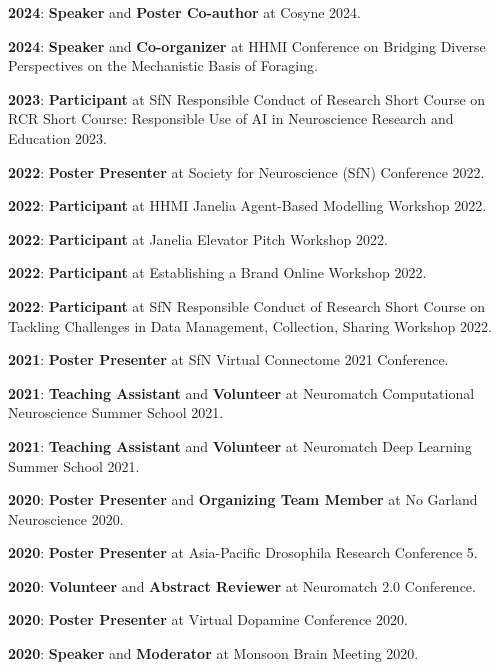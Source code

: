 \documentclass[letterpaper,9pt]{article}
\newcommand{\resumeItem}[2]{
  \item\small{
    \textbf{#1}{: #2 \vspace{-2pt}}
  }
}
\newcommand{\resumeSubItem}[2]{\resumeItem{#1}{#2}\vspace{-4pt}}
\begin{document}
    \resumeSubItem{2024}
      {\textbf{Speaker} and \textbf{Poster Co-author} at Cosyne 2024.}
    
    \resumeSubItem{2024}
      {\textbf{Speaker} and \textbf{Co-organizer} at HHMI Conference on Bridging Diverse Perspectives on the Mechanistic Basis of Foraging.}
    
    \resumeSubItem{2023}
      {\textbf{Participant} at SfN Responsible Conduct of Research Short Course on RCR Short Course: Responsible Use of AI in Neuroscience Research and Education 2023.}
    
    \resumeSubItem{2022}
      {\textbf{Poster Presenter} at Society for Neuroscience (SfN) Conference 2022.}
    
    \resumeSubItem{2022}
      {\textbf{Participant} at HHMI Janelia Agent-Based Modelling Workshop 2022.}
    
    \resumeSubItem{2022}
      {\textbf{Participant} at Janelia Elevator Pitch Workshop 2022.}
    
    \resumeSubItem{2022}
      {\textbf{Participant} at Establishing a Brand Online Workshop 2022.}
    
    \resumeSubItem{2022}
      {\textbf{Participant} at SfN Responsible Conduct of Research Short Course on Tackling Challenges in Data Management, Collection, Sharing Workshop 2022.}
    
    \resumeSubItem{2021}
      {\textbf{Poster Presenter} at SfN Virtual Connectome 2021 Conference.}
    
    \resumeSubItem{2021}
      {\textbf{Teaching Assistant} and \textbf{Volunteer} at Neuromatch Computational Neuroscience Summer School 2021.}
    
    \resumeSubItem{2021}
      {\textbf{Teaching Assistant} and \textbf{Volunteer} at Neuromatch Deep Learning Summer School 2021.}
    
    \resumeSubItem{2020}
      {\textbf{Poster Presenter} and \textbf{Organizing Team Member} at No Garland Neuroscience 2020.}
    
    \resumeSubItem{2020}
      {\textbf{Poster Presenter} at Asia-Pacific Drosophila Research Conference 5.}
    
    \resumeSubItem{2020}
      {\textbf{Volunteer} and \textbf{Abstract Reviewer} at Neuromatch 2.0 Conference.}
    
    \resumeSubItem{2020}
      {\textbf{Poster Presenter} at Virtual Dopamine Conference 2020.}
    
    \resumeSubItem{2020}
      {\textbf{Speaker} and \textbf{Moderator} at Monsoon Brain Meeting 2020.}
    
\end{document}
